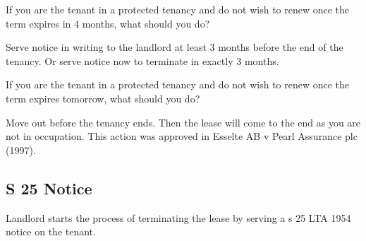 \documentclass[
]{article}
\newenvironment{env-fdd3b853-72b2-4779-a214-b5da0ccdb5e7}
{
    \savenotes\tcolorbox[blanker,breakable,left=5pt,borderline west={2pt}{-4pt}{gray}]
}
{
    \endtcolorbox\spewnotes
}
\begin{document}
\begin{env-fdd3b853-72b2-4779-a214-b5da0ccdb5e7}

If you are the tenant in a protected tenancy and do not wish to renew
once the term expires in 4 months, what should you do?

Serve notice in writing to the landlord at least 3 months before the end
of the tenancy. Or serve notice now to terminate in exactly 3 months.

\end{env-fdd3b853-72b2-4779-a214-b5da0ccdb5e7}

\begin{env-fdd3b853-72b2-4779-a214-b5da0ccdb5e7}

If you are the tenant in a protected tenancy and do not wish to renew
once the term expires tomorrow, what should you do?

Move out before the tenancy ends. Then the lease will come to the end as
you are not in occupation. This action was approved in Esselte AB v
Pearl Assurance plc (1997).

\end{env-fdd3b853-72b2-4779-a214-b5da0ccdb5e7}

\hypertarget{s-25-notice}{%
\subsection{S 25 Notice}\label{s-25-notice}}

Landlord starts the process of terminating the lease by serving a s 25
LTA 1954 notice on the tenant.
\end{document}
